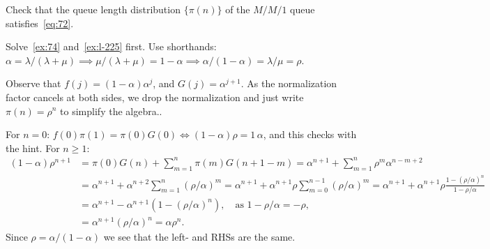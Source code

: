 \begin{exercise}\label{ex:l-229}
Check
 that the queue length distribution $\{\pi(n)\}$ of the $M/M/1$ queue satisfies~\cref{eq:72}.
\begin{hint}
Solve~\cref{ex:74} and~\cref{ex:l-225} first. Use shorthands:
$\alpha=\lambda/(\lambda+\mu) \implies \mu/(\lambda+\mu) = 1-\alpha \implies \alpha/(1-\alpha) = \lambda /\mu = \rho$.
\end{hint}
\begin{solution}
  Observe that $f(j)=(1-\alpha)\alpha^j$, and $G(j) = \alpha^{j+1}$.
  As the normalization factor cancels at both sides, we drop the normalization and  just write $\pi(n) = \rho^n$ to simplify the algebra..

For $n=0$: $f(0) \pi(1) = \pi(0) G(0) \iff (1-\alpha) \rho  = 1\, \alpha$, and this checks with the hint.
For $n\geq 1$:
\begin{align*}
 (1-\alpha)\rho^{n+1}
&= \pi(0) G(n) + \sum_{m=1}^n\pi(m) G(n+1-m)
=\alpha^{n+1} + \sum_{m=1}^n \rho^m \alpha^{n-m+2} \\
&= \alpha^{n+1} + \alpha^{n+2}\sum_{m=1}^n (\rho/\alpha)^m
= \alpha^{n+1} + \alpha^{n+1}\rho \sum_{m=0}^{n-1} (\rho/\alpha)^m
= \alpha^{n+1} + \alpha^{n+1}\rho \frac{1-(\rho/\alpha)^n}{1-\rho/\alpha}\\
&= \alpha^{n+1} - \alpha^{n+1}(1-(\rho/\alpha)^n), \quad\text{as } 1- \rho/\alpha = -\rho,\\
&= \alpha^{n+1}(\rho/\alpha)^n = \alpha \rho^n.
\end{align*}
Since $\rho=\alpha/(1-\alpha)$ we see that the left- and RHSs are the same.
\end{solution}
\end{exercise}




